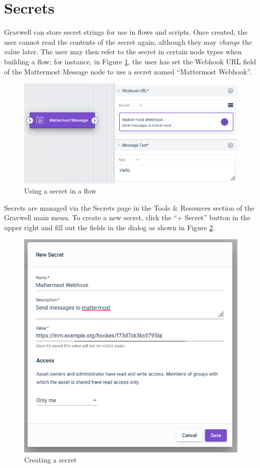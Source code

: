 
\clearpage

\section{Secrets}

Gravwell can store secret strings for use in flows and scripts. Once created, the user cannot read the contents of the secret again, although they may \emph{change} the value later. The user may then refer to the secret in certain node types when building a flow; for instance, in Figure \ref{fig:secret-flow}, the user has set the Webhook URL field of the Mattermost Message node to use a secret named ``Mattermost Webhook''.

\begin{figure}
	\includegraphics[width=0.6\linewidth]{images/secret-flow.png}
	\caption{Using a secret in a flow}
	\label{fig:secret-flow}
\end{figure}

Secrets are managed via the Secrets page in the Tools \& Resources section of the Gravwell main menu. To create a new secret, click the ``+ Secret'' button in the upper right and fill out the fields in the dialog as shown in Figure \ref{fig:new-secret}. 

\begin{figure}
	\includegraphics[width=0.5\linewidth]{images/new-secret.png}
	\caption{Creating a secret}
	\label{fig:new-secret}
\end{figure}

